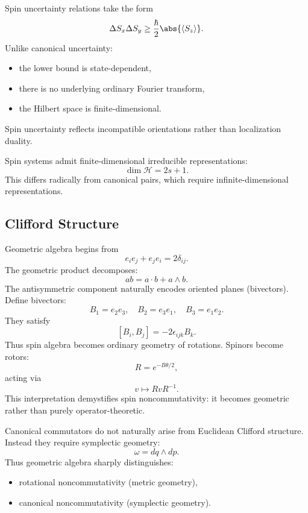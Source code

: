 Spin uncertainty relations take the form
\[
\Delta S_x\Delta S_y
\ge
\frac{\hbar}{2}\abs{\langle S_z\rangle}.
\]
Unlike canonical uncertainty:
\begin{itemize}
\item the lower bound is state-dependent,
\item there is no underlying ordinary Fourier transform,
\item the Hilbert space is finite-dimensional.
\end{itemize}
Spin uncertainty reflects incompatible orientations rather 
than localization duality.

Spin systems admit finite-dimensional irreducible representations:
\[\dim\mathcal H = 2s+1.\]
This differs radically from canonical pairs, 
which require infinite-dimensional representations.

\subsection{Clifford Structure}
Geometric algebra begins from
\[e_ie_j+e_je_i=2\delta_{ij}.\]
The geometric product decomposes:
\[ab=a\cdot b+a\wedge b.\]
The antisymmetric component naturally encodes oriented planes (bivectors).
Define bivectors:
\[
B_1=e_2e_3,\quad
B_2=e_3e_1,\quad
B_3=e_1e_2.
\]
They satisfy
\[[B_i,B_j]=-2\epsilon_{ijk}B_k.\]
Thus spin algebra becomes ordinary geometry of rotations.
Spinors become rotors:
\[R=e^{-B\theta/2},\]
acting via
\[v\mapsto RvR^{-1}.\]
This interpretation demystifies spin noncommutativity:
it becomes geometric rather than purely operator-theoretic.

Canonical commutators do not naturally arise from Euclidean Clifford structure.
Instead they require symplectic geometry:
\[\omega=dq\wedge dp.\]
Thus geometric algebra sharply distinguishes:
\begin{itemize}
\item rotational noncommutativity (metric geometry),
\item canonical noncommutativity (symplectic geometry).
\end{itemize}

